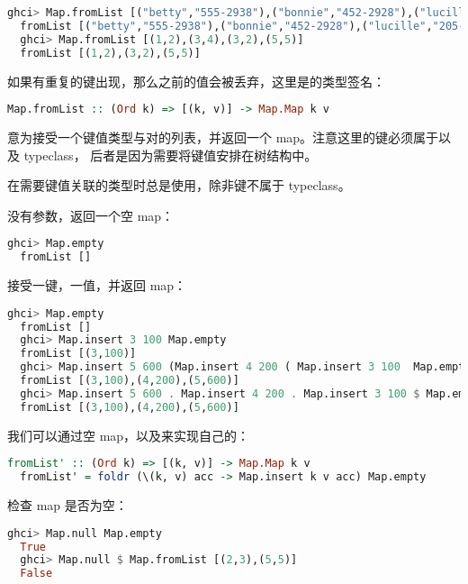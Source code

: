 \documentclass[./main.tex]{subfiles}
\begin{document}
\begin{lstlisting}[language=Haskell]
  ghci> Map.fromList [("betty","555-2938"),("bonnie","452-2928"),("lucille","205-2928")]
  fromList [("betty","555-2938"),("bonnie","452-2928"),("lucille","205-2928")]
  ghci> Map.fromList [(1,2),(3,4),(3,2),(5,5)]
  fromList [(1,2),(3,2),(5,5)]
\end{lstlisting}

如果有重复的键出现，那么之前的值会被丢弃，这里是的类型签名：

\begin{lstlisting}[language=Haskell]
  Map.fromList :: (Ord k) => [(k, v)] -> Map.Map k v
\end{lstlisting}

意为接受一个键值类型与对的列表，并返回一个 map。注意这里的键必须属于以及 typeclass，
后者是因为需要将键值安排在树结构中。

在需要键值关联的类型时总是使用，除非键不属于 typeclass。

没有参数，返回一个空 map：

\begin{lstlisting}[language=Haskell]
  ghci> Map.empty
  fromList []
\end{lstlisting}

接受一键，一值，并返回 map：

\begin{lstlisting}[language=Haskell]
  ghci> Map.empty
  fromList []
  ghci> Map.insert 3 100 Map.empty
  fromList [(3,100)]
  ghci> Map.insert 5 600 (Map.insert 4 200 ( Map.insert 3 100  Map.empty))
  fromList [(3,100),(4,200),(5,600)]
  ghci> Map.insert 5 600 . Map.insert 4 200 . Map.insert 3 100 $ Map.empty
  fromList [(3,100),(4,200),(5,600)]
\end{lstlisting}

我们可以通过空 map，以及来实现自己的：

\begin{lstlisting}[language=Haskell]
  fromList' :: (Ord k) => [(k, v)] -> Map.Map k v
  fromList' = foldr (\(k, v) acc -> Map.insert k v acc) Map.empty
\end{lstlisting}

检查 map 是否为空：

\begin{lstlisting}[language=Haskell]
  ghci> Map.null Map.empty
  True
  ghci> Map.null $ Map.fromList [(2,3),(5,5)]
  False
\end{lstlisting}
\end{document}
